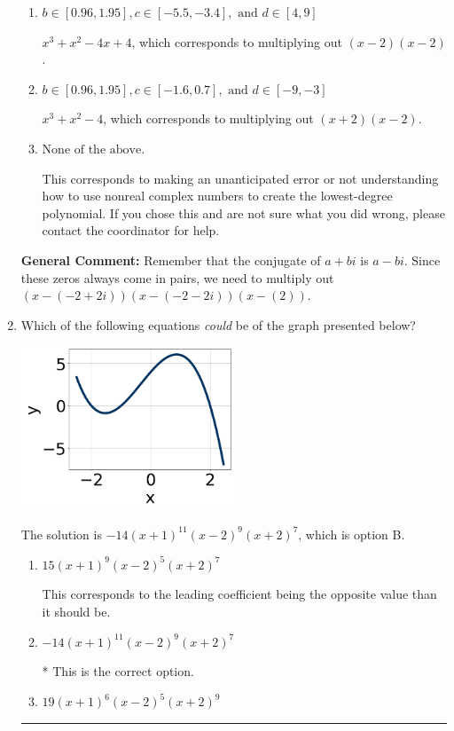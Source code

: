 \documentclass{extbook}[14pt]
\newcommand{\litem}[1]{\item #1

\rule{\textwidth}{0.4pt}}
\begin{document}
\begin{enumerate}
{\begin{enumerate}[label=\Alph*.]
$x^{3} -2 x^{2} + 16$, which corresponds to multiplying out $(x-(-2 + 2 i))(x-(-2 - 2 i))(x + 2)$.
\item \( b \in [0.96, 1.95], c \in [-5.5, -3.4], \text{ and } d \in [4, 9] \)

$x^{3} + x^{2} -4 x + 4$, which corresponds to multiplying out $(x -2)(x -2)$.
\item \( b \in [0.96, 1.95], c \in [-1.6, 0.7], \text{ and } d \in [-9, -3] \)

$x^{3} + x^{2} -4$, which corresponds to multiplying out $(x + 2)(x -2)$.
\item \( \text{None of the above.} \)

This corresponds to making an unanticipated error or not understanding how to use nonreal complex numbers to create the lowest-degree polynomial. If you chose this and are not sure what you did wrong, please contact the coordinator for help.
\end{enumerate}

\textbf{General Comment:} Remember that the conjugate of $a+bi$ is $a-bi$. Since these zeros always come in pairs, we need to multiply out $(x-(-2 + 2 i))(x-(-2 - 2 i))(x-(2))$.
}
\litem{
Which of the following equations \textit{could} be of the graph presented below?

\begin{center}
    \includegraphics[width=0.5\textwidth]{../Figures/polyGraphToFunctionA.png}
\end{center}


The solution is \( -14(x + 1)^{11} (x - 2)^{9} (x + 2)^{7} \), which is option B.\begin{enumerate}[label=\Alph*.]
\item \( 15(x + 1)^{9} (x - 2)^{5} (x + 2)^{7} \)

This corresponds to the leading coefficient being the opposite value than it should be.
\item \( -14(x + 1)^{11} (x - 2)^{9} (x + 2)^{7} \)

* This is the correct option.
\item \( 19(x + 1)^{6} (x - 2)^{5} (x + 2)^{9} \)


\end{enumerate}}
\end{enumerate}
\end{document}

